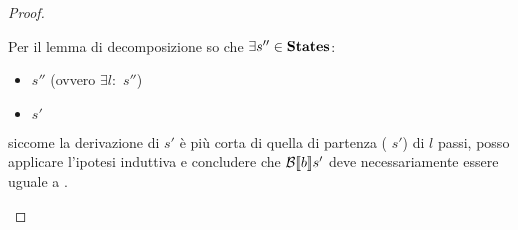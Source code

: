 {\begin{proof}
\begin{itemize}
   Per il lemma di decomposizione so che $\exists s''\in\mbox{\textbf{States}}$:
   \begin{itemize}
   \item {} \Rar{*} $s''$ (ovvero $\exists l:$
       $s''$)
   \item {} \Rar{*} $s'$
   \end{itemize}
   siccome la derivazione di   $s'$ è più
   corta di quella di partenza ( 
   $s'$) di $l$ passi, posso applicare l'ipotesi
   induttiva e concludere che $\mathcal{B} \llbracket b \rrbracket s'$ deve necessariamente essere
   uguale a \semfalse.

  \end{itemize} 
 \end{proof}
}
